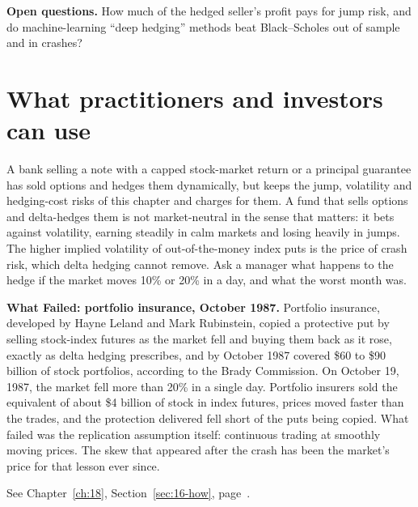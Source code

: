\label{sec:14-open}
\textbf{Open questions.} How much of the hedged seller's profit pays for jump risk, and do machine-learning ``deep hedging'' methods beat Black--Scholes out of sample and in crashes?

\section{What practitioners and investors can use}
\label{sec:14-investors}

A bank selling a note with a capped stock-market return or a principal guarantee has sold options and hedges them dynamically, but keeps the jump, volatility and hedging-cost risks of this chapter and charges for them. A fund that sells options and delta-hedges them is not market-neutral in the sense that matters: it bets against volatility, earning steadily in calm markets and losing heavily in jumps. The higher implied volatility of out-of-the-money index puts is the price of crash risk, which delta hedging cannot remove. Ask a manager what happens to the hedge if the market moves 10\% or 20\% in a day, and what the worst month was.

\begin{callout}
\textbf{What Failed: portfolio insurance, October 1987.} Portfolio insurance, developed by Hayne Leland and Mark Rubinstein, copied a protective put by selling stock-index futures as the market fell and buying them back as it rose, exactly as delta hedging prescribes, and by October 1987 covered \$60 to \$90 billion of stock portfolios, according to the Brady Commission. On October 19, 1987, the market fell more than 20\% in a single day. Portfolio insurers sold the equivalent of about \$4 billion of stock in index futures, prices moved faster than the trades, and the protection delivered fell short of the puts being copied. What failed was the replication assumption itself: continuous trading at smoothly moving prices. The skew that appeared after the crash has been the market's price for that lesson ever since.
\end{callout}

\makeatletter
{}
\makeatother

\begin{keyterms}
\small
\begin{description}[leftmargin=0pt, itemsep=2pt, parsep=0pt, font=\normalfont\bfseries\color{FEMaroon}]
  \item[Option selling.] See Chapter~\ref{ch:18}, Section~\ref{sec:16-how}, page~\pageref{sec:16-how}.
\end{description}
\end{keyterms}
